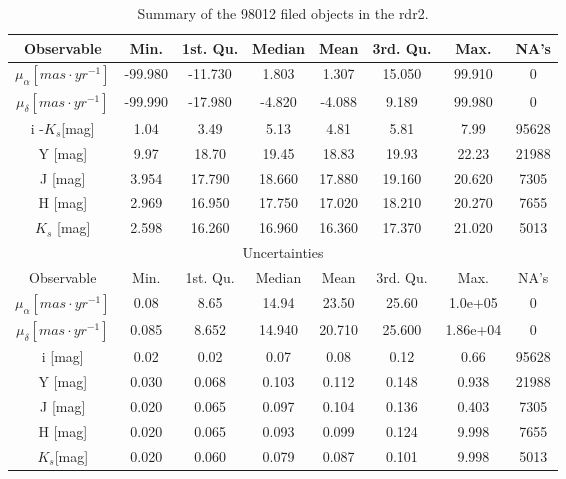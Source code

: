 \begin{table}[ht!]
\caption{Summary of the 98012 filed objects in the \gls{rdr2}.}
\begin{center}
\begin{tabular}{|c|c|c|c|c|c|c|c|}
\hline
Observable & Min. & 1st. Qu. & Median & Mean & 3rd. Qu. & Max. & NA's \\
\hline
\hline
$\mu_{\alpha} [mas\cdot yr^{-1}]$&-99.980& -11.730  & 1.803 &  1.307 & 15.050 & 99.910&0\\
$\mu_{\delta} [mas\cdot yr^{-1}]$&-99.990& -17.980  &-4.820  &-4.088   &9.189  &99.980&0\\
i -$K_s$[mag] &   1.04 &   3.49  &  5.13    &   4.81  &  5.81  &  7.99 &  95628 \\
Y [mag]          & 9.97  & 18.70      &  19.45 &  18.83 &  19.93 &  22.23  & 21988 \\
J [mag]          & 3.954 & 17.790 & 18.660 & 17.880 & 19.160 & 20.620 &   7305\\
H [mag]         & 2.969 & 16.950 & 17.750 & 17.020 & 18.210 & 20.270  &  7655\\
$K_s$ [mag] & 2.598 & 16.260 & 16.960  &16.360  &17.370 & 21.020 &   5013\\
\hline
\multicolumn{8}{c}{Uncertainties}\\
\hline
Observable & Min. & 1st. Qu. & Median &Mean& 3rd. Qu. & Max. & NA's \\
\hline
\hline
$\mu_{\alpha} [mas\cdot yr^{-1}]$&0.08  &    8.65   &  14.94   &  23.50   &  25.60 &1.0e+05&0\\ 
$\mu_{\delta} [mas\cdot yr^{-1}]$&0.085  &   8.652  &  14.940  &  20.710  &  25.600 &1.86e+04 & 0\\ 
i [mag] & 0.02        &  0.02    &    0.07 &   0.08 &  0.12   & 0.66    &    95628 \\
Y [mag] & 0.030     &   0.068&   0.103&  0.112 &   0.148&0.938  &   21988\\
J [mag] & 0.020      &  0.065  & 0.097  & 0.104 & 0.136  &0.403   & 7305\\
H [mag] & 0.020     &  0.065  & 0.093  &0.099  & 0.124  &9.998   & 7655\\
$K_s$[mag]&0.020 &  0.060 &  0.079 & 0.087  & 0.101 & 9.998  & 5013\\
\hline
\end{tabular}
\end{center}
\label{tab:rddr2_field}
\end{table}%

